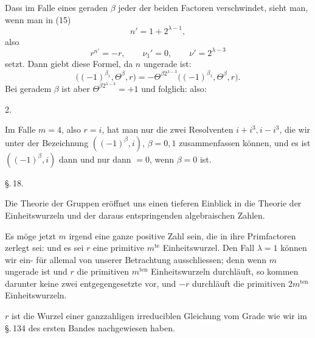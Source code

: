 Dass im Falle eines geraden $\beta$ jeder der beiden Factoren verschwindet, sieht man, wenn man in (15)
\[
n' = 1 + 2^{\lambda-1},
\]
also
\[
r^{n'} = -r, \qquad \nu_1' = 0, \qquad \nu' = 2^{\lambda-3}
\]
setzt. Dann giebt diese Formel, da $n$ ungerade ist:
\[
\bigl((-1)^{\beta_1}, \Theta^\beta, r\bigr) = -\Theta^{\beta 2^{\lambda-3}} \bigl((-1)^{\beta_1}, \Theta^\beta, r\bigr).
\]
Bei geradem $\beta$ ist aber $\Theta^{\beta 2^{\lambda-3}} = +1$ und folglich:
also:

2.~

Im Falle $m=4$, also $r=i$, hat man nur die zwei Resolventen $i+i^3, i-i^3$, die wir unter der Bezeichnung $((-1)^\beta, i)$, $\beta=0,1$ zusammenfassen können, und es ist $((-1)^\beta, i)$ dann und nur dann $=0$, wenn $\beta=0$ ist.

\begin{center}
\S.\,18.\\
\end{center}

Die Theorie der  Gruppen eröffnet uns einen tieferen Einblick in die Theorie der Einheitswurzeln und der daraus entspringenden algebraischen Zahlen.

Es möge jetzt $m$ irgend eine ganze positive Zahl sein, die in ihre Primfactoren zerlegt sei:
und es sei $r$ eine primitive $m^{\text{te}}$ Einheitswurzel. Den Fall $\lambda=1$ können wir ein- für allemal von unserer Betrachtung ausschliessen; denn wenn $m$ ungerade ist und $r$ die primitiven $m^{\text{ten}}$ Einheitswurzeln durchläuft, so kommen darunter keine zwei entgegengesetzte vor, und $-r$ durchläuft die primitiven $2m^{\text{ten}}$ Einheitswurzeln.

$r$ ist die Wurzel einer ganzzahligen irreduciblen  Gleichung vom Grade
wie wir im \S.\,134 des ersten Bandes nachgewiesen haben.
